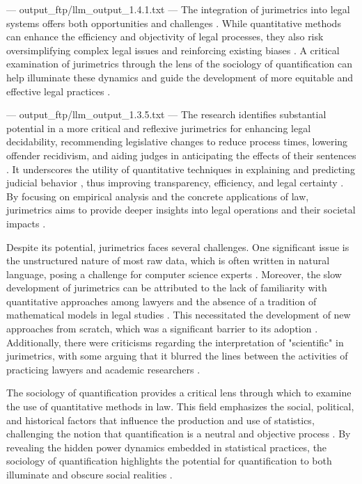 ---
output_ftp/llm_output_1.4.1.txt
---
The integration of jurimetrics into legal systems offers both opportunities and challenges \cite{citation_key1}. While quantitative methods can enhance the efficiency and objectivity of legal processes, they also risk oversimplifying complex legal issues and reinforcing existing biases \cite{citation_key2}. A critical examination of jurimetrics through the lens of the sociology of quantification can help illuminate these dynamics and guide the development of more equitable and effective legal practices \cite{citation_key3}.


---
output_ftp/llm_output_1.3.5.txt
---
The research identifies substantial potential in a more critical and reflexive jurimetrics for enhancing legal decidability, recommending legislative changes to reduce process times, lowering offender recidivism, and aiding judges in anticipating the effects of their sentences \cite{nunes2018_107-107}. It underscores the utility of quantitative techniques in explaining and predicting judicial behavior \cite{luvizotto2020_4-5}, thus improving transparency, efficiency, and legal certainty \cite{silva2023_14-16}. By focusing on empirical analysis and the concrete applications of law, jurimetrics aims to provide deeper insights into legal operations and their societal impacts \cite{nunes2018_89-90}.

Despite its potential, jurimetrics faces several challenges. One significant issue is the unstructured nature of most raw data, which is often written in natural language, posing a challenge for computer science experts \cite{103390fi9040068}. Moreover, the slow development of jurimetrics can be attributed to the lack of familiarity with quantitative approaches among lawyers and the absence of a tradition of mathematical models in legal studies \cite{l2010de}. This necessitated the development of new approaches from scratch, which was a significant barrier to its adoption \cite{l2010de}. Additionally, there were criticisms regarding the interpretation of "scientific" in jurimetrics, with some arguing that it blurred the lines between the activities of practicing lawyers and academic researchers \cite{l2010de}.

The sociology of quantification provides a critical lens through which to examine the use of quantitative methods in law. This field emphasizes the social, political, and historical factors that influence the production and use of statistics, challenging the notion that quantification is a neutral and objective process \cite{10.1007/978-3-319-44000-2_15,10.3390/fi9040068}. By revealing the hidden power dynamics embedded in statistical practices, the sociology of quantification highlights the potential for quantification to both illuminate and obscure social realities \cite{10.1007/978-3-319-44000-2_15,10.3390/fi9040068}.

